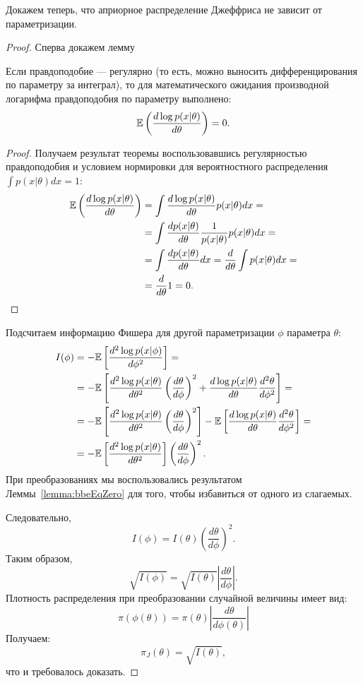 Докажем теперь, что априорное распределение Джеффриса не зависит от параметризации.
\begin{proof}

Сперва докажем лемму
\begin{Lemma}
\label{lemma:bbeEqZero}
Если правдоподобие --- регулярно (то есть, можно выносить дифференцирования по параметру за интеграл), то
для математического ожидания производной логарифма правдоподобия по параметру выполнено:
\[
\mathbb{E} \left(\frac{d \log p(x | \theta)}{d \theta} \right) = 0.
\]
\end{Lemma}
\begin{proof}
Получаем результат теоремы воспользовавшись регулярностью правдоподобия и условием нормировки для вероятностного распределения $\int p(x| \theta) dx = 1$:
\begin{align*}
\mathbb{E} \left(\frac{d \log p(x | \theta)}{d \theta} \right) &= \int \frac{d \log p(x | \theta)}{d \theta} p(x| \theta) dx = \\
                                                         &= \int \frac{d p(x | \theta)}{d \theta} \frac{1}{p(x | \theta)} p(x| \theta) dx =\\
                                                         &= \int \frac{d p(x | \theta)}{d \theta} dx = \frac{d}{d \theta} \int p(x| \theta) dx =\\
                                                         &= \frac{d}{d \theta} 1 = 0. \\
\end{align*}
\end{proof}

Подсчитаем информацию Фишера для другой параметризации $\phi$ параметра $\theta$:
\begin{align*}
I(\phi) &= -\mathbb{E} \left[\frac{d^2 \log p(x | \phi)}{d \phi^2} \right] = \\
&= -\mathbb{E} \left[\frac{d^2 \log p(x | \theta)}{d \theta^2}  \left(\frac{d \theta}{d \phi} \right)^2 + \frac{d \log p(x | \theta)}{d \theta} \frac{d^2 \theta}{d \phi^2} \right] = \\
&= -\mathbb{E} \left[\frac{d^2 \log p(x | \theta)}{d \theta^2}  \left(\frac{d \theta}{d \phi} \right)^2 \right] -\mathbb{E} \left[ \frac{d \log p(x | \theta)}{d \theta} \frac{d^2 \theta}{d \phi^2} \right] = \\
&= -\mathbb{E} \left[\frac{d^2 \log p(x | \theta)}{d \theta^2} \right] \left(\frac{d \theta}{d \phi} \right)^2.
\end{align*}
При преобразованиях мы воспользовались результатом Леммы~\ref{lemma:bbeEqZero} для того, чтобы избавиться от одного из слагаемых.

Следовательно,
\[
I(\phi) = I(\theta) \left(\frac{d \theta}{d \phi} \right)^2.
\]
Таким образом,
\[
\sqrt{I(\phi)} = \sqrt{I(\theta)} \left| \frac{d \theta}{d \phi} \right|.
\]
Плотность распределения при преобразовании случайной величины имеет вид:
\[
\pi(\phi(\theta)) = \pi(\theta) \left| \frac{d \theta}{d \phi(\theta)} \right|
\]
Получаем:
\[
\pi_J(\theta) = \sqrt{I(\theta)},
\]
что и требовалось доказать.

\end{proof}

